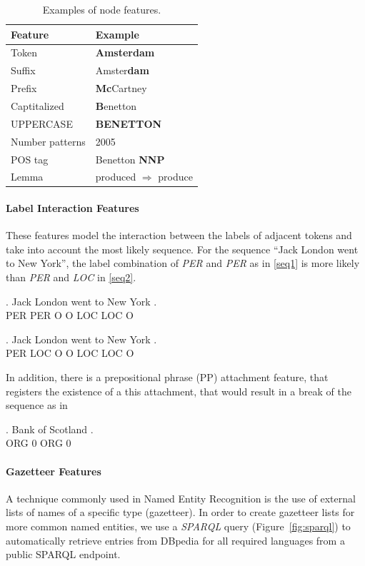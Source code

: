 \documentclass[11pt]{article}
\begin{document}
\begin{table}[h!]
\small
\begin{tabular}{ l l }
\bf Feature & \bf Example \\
\hline
Token &  \textbf{Amsterdam}\\
Suffix& Amster\textbf{dam}\\
Prefix&  \textbf{Mc}Cartney\\
Captitalized& \textbf{B}enetton\\
UPPERCASE &  \textbf{BENETTON}\\
Number patterns & 2005\\
POS tag &  Benetton \textbf{NNP}   \\
Lemma & produced $\Rightarrow$ produce \\

\end{tabular}


\caption{\normalsize Examples of node features.}
\label{table:node}
\end{table}

\paragraph*{Label Interaction Features}
These features model the interaction between the labels of adjacent tokens and take into account the most likely sequence. 
For the sequence ``Jack London went to New York'', the label combination of \emph{PER} and \emph{PER} as in \ref{seq1} is more likely than \emph{PER} and \emph{LOC} in \ref{seq2}.

\exg. Jack London went to New York .\\
      PER   PER   O    O  LOC LOC  O \\\label{seq1}

\exg. Jack London went to New York . \\ 
      PER  LOC    O    O  LOC LOC O \\\label{seq2}
      
In addition, there is a prepositional phrase (PP) attachment feature, that registers the existence of a this attachment, that would
result in a break of the sequence as in

\exg. Bank of Scotland . \\ 
      ORG   0    ORG   0  \\\label{seq3}
    

\paragraph*{Gazetteer Features}
A technique commonly used in Named Entity Recognition is the use of external lists of names of a specific type (gazetteer). 
In order to create gazetteer lists for more common named entities, we use a \emph{SPARQL} query  (Figure~\ref{fig:sparql}) 
to automatically retrieve entries from DBpedia for all required languages from a public SPARQL endpoint.
\end{document}
